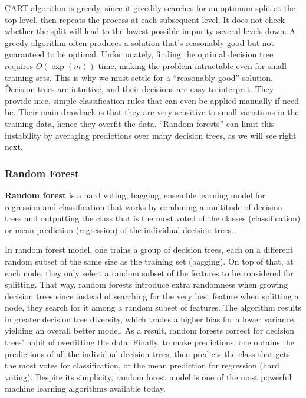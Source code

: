 CART algorithm is greedy, since it greedily searches for an optimum split at the top level, then repeats the process
at each subsequent level. It does not check whether the split will lead to the lowest possible impurity several
levels down. A greedy algorithm often produces a solution that's reasonably good but not guaranteed to be optimal.
Unfortunately, finding the optimal decision tree requires $O(\exp(m))$ time, making the problem intractable even for
small training sets. This is why we must settle for a ``reasonably good'' solution. \v

Decision trees are intuitive, and their decisions are easy to interpret. They provide nice, simple classification
rules that can even be applied manually if need be. Their main drawback is that they are very sensitive to small
variations in the training data, hence they overfit the data. ``Random forests'' can limit this instability by
averaging predictions over many decision trees, as we will see right next.

\subsubsection{Random Forest}

\textbf{Random forest} is a hard voting, bagging, ensemble learning model for regression and classification that works
by combining a multitude of decision trees and outputting the class that is the most voted of the classes
(classification) or mean prediction (regression) of the individual decision trees.
\ed

In random forest model, one trains a group of decision trees, each on a different random subset of the same size as
the training set (bagging). On top of that, at each node, they only select a random subset of the features to be
considered for splitting. That way, random forests introduce extra randomness when growing decision trees since
instead of searching for the very best feature when splitting a node, they search for it among a random subset of
features. The algorithm results in greater decision tree diversity, which trades a higher bias for a lower variance,
yielding an overall better model. As a result, random forests correct for decision trees' habit of overfitting the data.
Finally, to make predictions, one obtains the predictions of all the individual decision trees, then predicts the
class that gets the most votes for classification, or the mean prediction for regression (hard voting). Despite its
simplicity, random forest model is one of the most powerful machine learning algorithms available today.


